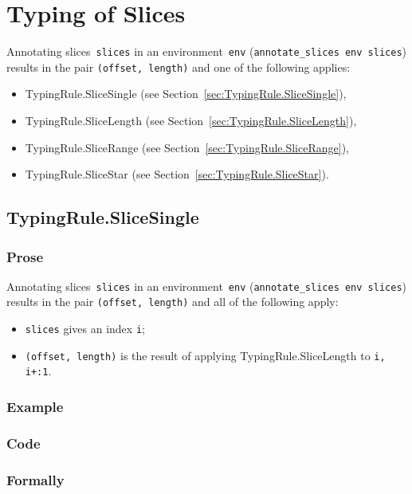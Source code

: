 \documentclass{book}
\begin{document}
\chapter{Typing of Slices}
Annotating slices~\texttt{slices} in an environment~\texttt{env}
(\texttt{annotate\_slices env slices}) results in the pair \texttt{(offset,
length)} and one of the following applies:
\begin{itemize}
\item TypingRule.SliceSingle (see Section~\ref{sec:TypingRule.SliceSingle}),
\item TypingRule.SliceLength (see Section~\ref{sec:TypingRule.SliceLength}),
\item TypingRule.SliceRange (see Section~\ref{sec:TypingRule.SliceRange}),
\item TypingRule.SliceStar (see Section~\ref{sec:TypingRule.SliceStar}).
\end{itemize}

\section{TypingRule.SliceSingle \label{sec:TypingRule.SliceSingle}}

  \subsection{Prose}
   Annotating slices~\texttt{slices} in an environment~\texttt{env}
(\texttt{annotate\_slices env slices}) results in the pair \texttt{(offset,
length)} and all of the following apply: 
   \begin{itemize}
   \item \texttt{slices} gives an index \texttt{i};
   \item \texttt{(offset, length)} is the result of applying TypingRule.SliceLength to \texttt{i, i+:1}.
   \end{itemize}

  \subsection{Example}

  \subsection{Code}

\begin{emptyformal}
    \subsection{Formally}
\end{emptyformal}
\end{document}
